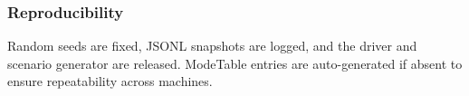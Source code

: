 
\subsubsection{Reproducibility}
\label{subsec:repro}
Random seeds are fixed, JSONL snapshots are logged, and the driver and
scenario generator are released. ModeTable entries are auto-generated if
absent to ensure repeatability across machines.

